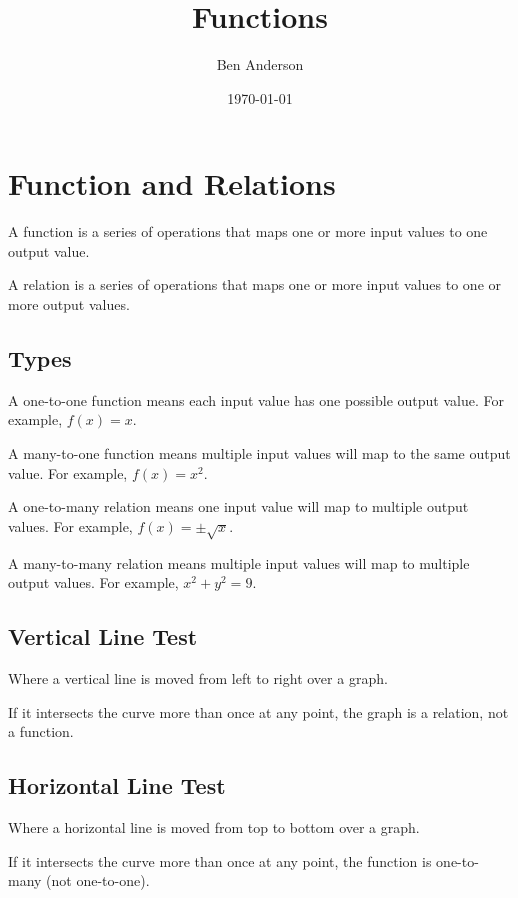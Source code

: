 \documentclass[a4paper,11pt]{article}
\begin{document}
\title{Functions}
\author{Ben Anderson}
\date{\today}
\maketitle
\pagebreak

\tableofcontents
\pagebreak


\section{Function and Relations}

A function is a series of operations that maps one or more input values to one
output value.

A relation is a series of operations that maps one or more input values to one
or more output values.


\subsection{Types}

A one-to-one function means each input value has one possible output value.
For example, $f(x) = x$.

A many-to-one function means multiple input values will map to the same output
value. For example, $f(x) = x^2$.

A one-to-many relation means one input value will map to multiple output values.
For example, $f(x) = \pm \sqrt{x}$.

A many-to-many relation means multiple input values will map to multiple output
values. For example, $x^2 + y^2 = 9$.


\subsection{Vertical Line Test}

Where a vertical line is moved from left to right over a graph.

If it intersects the curve more than once at any point, the graph is a relation,
not a function.


\subsection{Horizontal Line Test}

Where a horizontal line is moved from top to bottom over a graph.

If it intersects the curve more than once at any point, the function is
one-to-many (not one-to-one).
\end{document}
